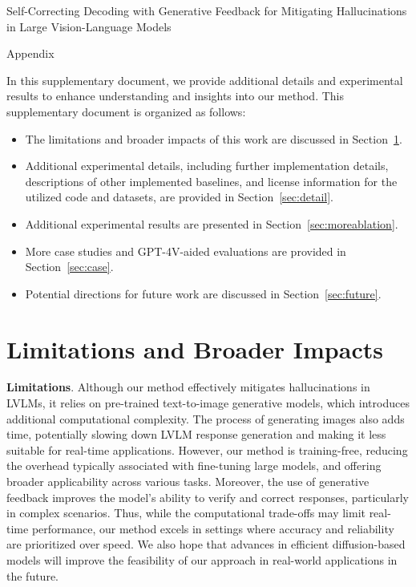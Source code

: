 \clearpage
\appendix
\renewcommand{\thesection}{\Alph{section}}
\renewcommand\thefigure{\Alph{section}\arabic{figure}} 
\renewcommand\thetable{\Alph{section}\arabic{table}}  
\setcounter{section}{0}
\setcounter{figure}{0} 
\setcounter{table}{0} 

{\LARGE\sc Self-Correcting Decoding with Generative Feedback for Mitigating Hallucinations in Large Vision-Language Models\par}

{\LARGE\sc Appendix\par} \vspace{10pt}

In this supplementary document, we provide additional details and experimental results to enhance understanding and insights into our method.
This supplementary document is organized as follows:
\begin{itemize}[leftmargin=0.5cm, itemindent=0cm, itemsep=4pt,topsep=4pt,parsep=0pt]
    \item The limitations and broader impacts of this work are discussed in Section~\ref{sec:limitation}.
    \item Additional experimental details, including further implementation details, descriptions of other implemented baselines, and license information for the utilized code and datasets, are provided in Section~\ref{sec:detail}.
    \item Additional experimental results are presented in Section~\ref{sec:moreablation}.
    \item More case studies and GPT-4V-aided evaluations are provided in Section~\ref{sec:case}.
    \item Potential directions for future work are discussed in Section~\ref{sec:future}.
\end{itemize}

\section{Limitations and Broader Impacts}
\label{sec:limitation}
\textbf{Limitations}. Although our method effectively mitigates hallucinations in LVLMs, it relies on pre-trained text-to-image generative models, which introduces additional computational complexity. The process of generating images also adds time, potentially slowing down LVLM response generation and making it less suitable for real-time applications. However, our method is training-free, reducing the overhead typically associated with fine-tuning large models, and offering broader applicability across various tasks. Moreover, the use of generative feedback improves the model's ability to verify and correct responses, particularly in complex scenarios. Thus, while the computational trade-offs may limit real-time performance, our method excels in settings where accuracy and reliability are prioritized over speed. We also hope that advances in efficient diffusion-based models will improve the feasibility of our approach in real-world applications in the future.

